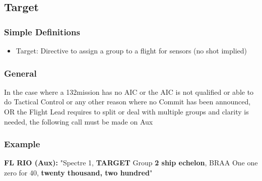 \subsection{Target}

\subsubsection*{Simple Definitions}

\begin{itemize}
  \item Target: Directive to assign a group to a flight for sensors (no shot
    implied)
\end{itemize}

\subsubsection*{General}

In the case where a 132\nd mission has no AIC or the AIC is not qualified or
able to do Tactical Control or any other reason where no Commit has been
announced, OR the Flight Lead requires to split or deal with multiple groups
and clarity is needed, the following call must be made on Aux

\subsubsection*{Example}

\textbf{FL RIO (Aux):} "Spectre 1, \textbf{TARGET} Group \textbf{2 ship
echelon}, BRAA One one zero for 40, \textbf{twenty thousand, two hundred}"



